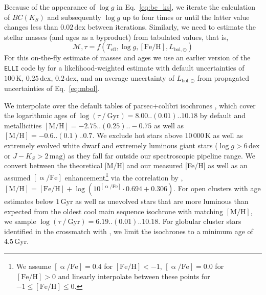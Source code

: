 \documentclass[
  journal=pasa,
  manuscript=research-paper, %
  year=2023,
  volume=37
]{cup-journal}
\begin{document}
Because of the appearance of $\log g$ in Eq.~\ref{eq:bc_ks}, we iterate the calculation of $BC(K_S)$ and subsequently $\log g$ up to four times or until the latter value changes less than $0.02\,\mathrm{dex}$ between iterations. Similarly, we need to estimate the stellar masses (and ages as a byproduct) from tabulated values, that is,
\begin{equation}
\mathcal{M}, \tau = f(T_\mathrm{eff}, \log g, \mathrm{[Fe/H]}, L_\mathrm{bol,\odot})
\label{eq:mass_age}
\end{equation}
For this on-the-fly estimate of masses and ages we use an earlier version of the \texttt{ELLI} code by \cite{Lin2018} for a likelihood-weighted estimate with default uncertainties of $100\,\mathrm{K}$, $0.25\,\mathrm{dex}$, $0.2\,\mathrm{dex}$, and an average uncertainty of $L_\mathrm{bol,\odot}$ from propagated uncertainties of Eq.~\ref{eq:mbol}.

We interpolate over the default tables of {\sc parsec+colibri} isochrones \citep{Bressan2012, Marigo2017}, which cover the logarithmic ages of $\log (\tau~/~\mathrm{Gyr}) = 8.00..(0.01)..10.18$ by default and metallicities $\mathrm{[M/H]} = -2.75..(0.25)..-0.75$ as well as $\mathrm{[M/H]} = -0.6..(0.1)..0.7$. We exclude hot stars above $10\,000\,\mathrm{K}$ as well as extremely evolved white dwarf and extremely luminous giant stars ($\log g > 6\,\mathrm{dex}$ or $J - K_S > 2\,\mathrm{mag}$) as they fall far outside our spectroscopic pipeline range. We convert between the theoretical [M/H] and our measured [Fe/H] as well as an assumed $\mathrm{[\upalpha/Fe]}$ enhancement\footnote{We assume $\mathrm{[\upalpha/Fe]} = 0.4$ for $\mathrm{[Fe/H]} < -1$, $\mathrm{[\upalpha/Fe]} = 0.0$ for $\mathrm{[Fe/H]} > 0$ and linearly interpolate between these points for $-1 \leq \mathrm{[Fe/H]} \leq 0$.} via the correlation by \citet{Salaris2006}, $\mathrm{[M/H]} = \mathrm{[Fe/H]} + \log\left(10^{\mathrm{[\upalpha/Fe]}} \cdot 0.694 + 0.306 \right)$. For open clusters with age estimates below $1\,\mathrm{Gyr}$ as well as unevolved stars that are more luminous than expected from the oldest cool main sequence isochrone with matching $\mathrm{[M/H]}$, we sample $\log (\tau~/~\mathrm{Gyr}) = 6.19..(0.01)..10.18$. For globular cluster stars identified in the crossmatch with \citet{Baumgardt2021}, we limit the isochrones to a minimum age of $4.5\,\mathrm{Gyr}$.
\end{document}
